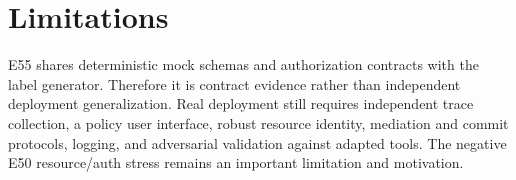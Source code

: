 \section{Limitations}
E55 shares deterministic mock schemas and authorization contracts with the label generator. Therefore it is contract evidence rather than independent deployment generalization. Real deployment still requires independent trace collection, a policy user interface, robust resource identity, mediation and commit protocols, logging, and adversarial validation against adapted tools. The negative E50 resource/auth stress remains an important limitation and motivation.

